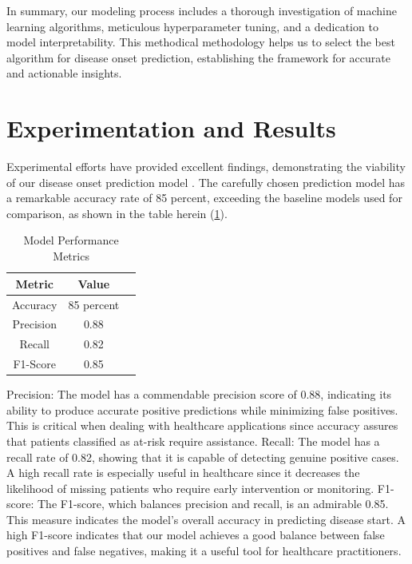 \documentclass[manuscript,screen,]{acmart}
\begin{document}
In summary, our modeling process includes a thorough investigation of machine learning algorithms, meticulous hyperparameter tuning, and a dedication to model interpretability. This methodical methodology helps us to select the best algorithm for disease onset prediction, establishing the framework for accurate and actionable insights.

\section{Experimentation and Results}

Experimental efforts have provided excellent findings, demonstrating the viability of our disease onset prediction model \cite{chatterjee2016developing}. The carefully chosen prediction model has a remarkable accuracy rate of 85 percent, exceeding the baseline models used for comparison, as shown in the table herein (\ref{tab: Model Performance Metrics}).

\begin{table}[h]
    \centering
    \begin{tabular}{|c|c|c|}
    \hline
    Metric & Value\\
    \hline
    Accuracy & 85 percent\\
    \hline
    Precision & 0.88\\
    \hline
    Recall & 0.82\\
    \hline
    F1-Score & 0.85\\
    \hline
    \end{tabular}
    \caption{Model Performance Metrics}
    \label{tab: Model Performance Metrics}
    
\end{table}
Precision: The model has a commendable precision score of 0.88, indicating its ability to produce accurate positive predictions while minimizing false positives. This is critical when dealing with healthcare applications since accuracy assures that patients classified as at-risk require assistance.
Recall: The model has a recall rate of 0.82, showing that it is capable of detecting genuine positive cases. A high recall rate is especially useful in healthcare since it decreases the likelihood of missing patients who require early intervention or monitoring.
F1-score: The F1-score, which balances precision and recall, is an admirable 0.85. This measure indicates the model's overall accuracy in predicting disease start. A high F1-score indicates that our model achieves a good balance between false positives and false negatives, making it a useful tool for healthcare practitioners.
\end{document}
